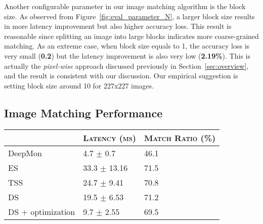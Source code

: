 \documentclass[10pt,acmtog]{acmart}
\newcommand{\framework}{DeepCache\xspace}
\newcommand{\sys}{\framework{}}
\newcommand{\revise}[1]{{#1}}
\begin{document}
Another configurable parameter in our image matching algorithm is the block size.
As observed from Figure~\ref{fig:eval_parameter_N}, a larger block size results in more latency improvement but also higher accuracy loss.
This result is reasonable since splitting an image into large blocks indicates more coarse-grained matching.
As an extreme case, when block size equals to 1, the accuracy loss is very small (\textbf{0.2}) but the latency improvement is also very low (\textbf{2.19\%}).
This is actually the \emph{pixel-wise} approach discussed previously in Section~\ref{sec:overview}, and the result is consistent with our discussion.
Our empirical suggestion is setting block size around 10 for 227x227 images.

\subsection{Image Matching Performance}\label{sec:eval_matching}%
\small
\centering
\begin{tabular}{L{2.5cm}ll} \hline
& \textsc{Latency (ms)} & \textsc{Match Ratio (\%)}\\\hline
DeepMon & 4.7 $\pm$ 0.7 & 46.1 \\ %
ES & 33.3 $\pm$ 13.16 & 71.5\\ %
TSS & 24.7 $\pm$ 9.41 & 70.8\\ %
DS & 19.5 $\pm$ 6.53 & 71.2\\ %
DS + optimization & 9.7 $\pm$ 2.55 & 69.5\\ \hline
\end{tabular}
\caption{\revise{A comparison of image matching algorithms between DeepMon~\cite{conf/mobisys/LocLB17} (row 1), which uses histogram-based matching, and \sys{} (the remaining rows) that uses different block matching algorithms in combination with optimization techniques mentioned in Section~\ref{sec:matching}.
\sys{} achieves much higher match ratios with minor increase in latency.}
}
\label{tab:eval_matching}
\end{document}
